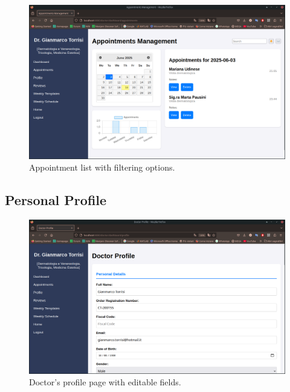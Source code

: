 \begin{figure}[!h]
    \centering
    \includegraphics[scale=0.30]{resources/screenshots/doctor_ui/appointments.png}
    \caption{Appointment list with filtering options.}
    \label{fig:appointment_list}
\end{figure}

\subsection{Personal Profile}

\begin{figure}[!h]
    \centering
    \includegraphics[scale=0.30]{resources/screenshots/doctor_ui/personal_info.png}
    \caption{Doctor's profile page with editable fields.}
    \label{fig:doctor_profile}
\end{figure}

